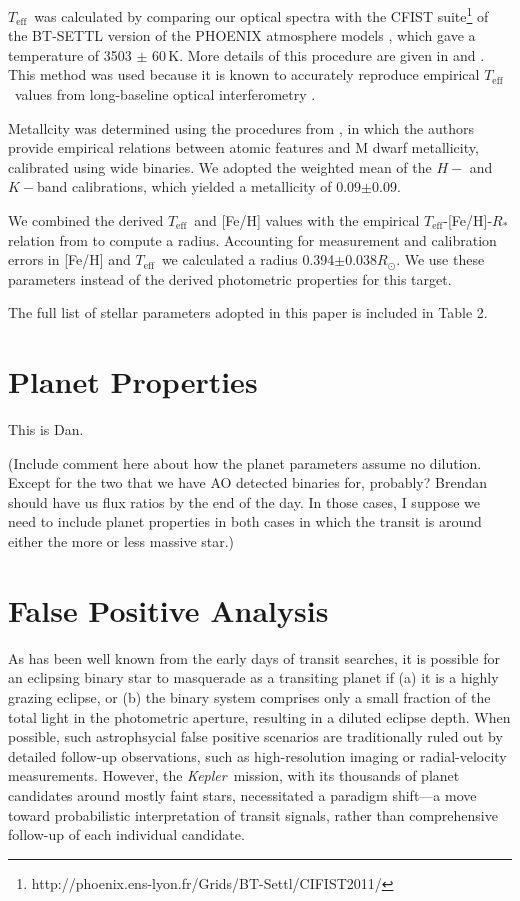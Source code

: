\documentclass{emulateapj}
\newcommand{\project}[1]{\textsl{#1}}
\newcommand{\kep}{\project{Kepler}}
\newcommand\teff{\ensuremath{T_\text{eff}}}
\begin{document}
\teff\ was calculated by comparing our optical spectra with the CFIST
suite\footnote{http://phoenix.ens-lyon.fr/Grids/BT-Settl/CIFIST2011/} of the BT-SETTL
version of the PHOENIX atmosphere models \citep{Allard13}, which gave a temperature
of 3503 $\pm$ 60\,K.
More details of this procedure are given in \citet{Mann14} and
\citet{Gaidos14}.
This method was used because it is known to accurately reproduce empirical
\teff\ values from long-baseline optical interferometry \citet{Boyajian12}.

Metallcity was determined using the procedures from \citet{Mann13a}, in which the
authors provide empirical relations between atomic features and M dwarf
metallicity, calibrated using wide binaries.
We adopted the weighted mean of the $H-$ and $K-$band calibrations,
which yielded a metallicity of 0.09$\pm$0.09.

We combined the derived \teff\ and [Fe/H] values with the empirical
\teff-[Fe/H]-$R_*$ relation from \citet{Mann15} to compute a radius.
Accounting for measurement and calibration errors in [Fe/H] and \teff\ we calculated
a radius 0.394$\pm0.038R_\odot$.
We use these parameters instead of the derived photometric properties for this target.

The full list of stellar parameters adopted in this paper is included in
Table 2.

\section{Planet Properties}

This is Dan.

(Include comment here about how the planet parameters assume no dilution.
Except for the two that we have AO detected binaries for, probably?
Brendan should have us flux ratios by the end of the day.
In those cases, I suppose we need to include planet properties in both cases
in which the transit is around either the more or less massive star.)

\section{False Positive Analysis}
As has been well known from the early days of transit searches, it is
possible for an eclipsing binary star to masquerade as a transiting
planet if (a) it is a highly grazing eclipse, or (b) the binary system
comprises only a small fraction of the total light in the photometric
aperture, resulting in a diluted eclipse depth.
When possible, such astrophsycial false positive scenarios are traditionally
ruled out by detailed follow-up observations, such as high-resolution
imaging or radial-velocity measurements.
However, the \kep\ mission, with its thousands of planet candidates
around mostly faint stars, necessitated a paradigm shift---a move
toward probabilistic interpretation of transit signals, rather than
comprehensive follow-up of each individual candidate.
\end{document}
